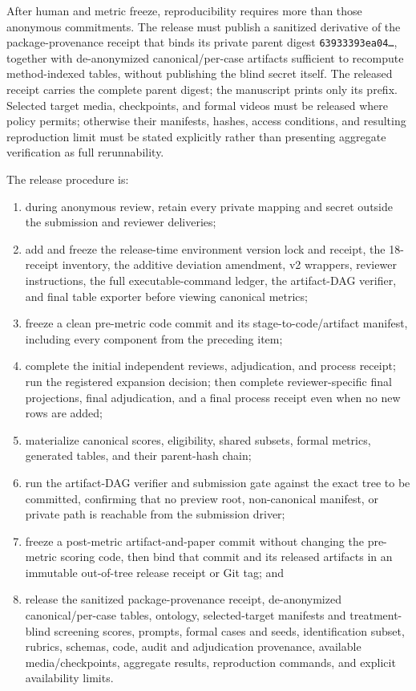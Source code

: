 After human and metric freeze, reproducibility requires more than those
anonymous commitments.  The release must publish a sanitized derivative of
the package-provenance receipt that binds its private parent digest
\texttt{63933393ea04\ldots}, together with de-anonymized canonical/per-case
artifacts sufficient to recompute method-indexed tables, without publishing
the blind secret itself.  The released receipt carries the complete parent
digest; the manuscript prints only its prefix.  Selected target media,
checkpoints, and formal videos must be released where policy permits;
otherwise their manifests, hashes, access conditions, and resulting
reproduction limit must be stated explicitly rather than presenting aggregate
verification as full rerunnability.

The release procedure is:
\begin{enumerate}
  \item during anonymous review, retain every private mapping and secret
        outside the submission and reviewer deliveries;
  \item add and freeze the release-time environment version lock and receipt,
        the 18-receipt inventory, the additive deviation amendment, v2 wrappers, reviewer
        instructions, the full executable-command ledger, the artifact-DAG
        verifier, and final table exporter before viewing canonical metrics;
  \item freeze a clean pre-metric code commit and its stage-to-code/artifact
        manifest, including every component from the preceding item;
  \item complete the initial independent reviews, adjudication, and process
        receipt; run the registered expansion decision; then complete
        reviewer-specific final projections, final adjudication, and a final
        process receipt even when no new rows are added;
  \item materialize canonical scores, eligibility, shared subsets, formal
        metrics, generated tables, and their parent-hash chain;
  \item run the artifact-DAG verifier and submission gate against the exact
        tree to be committed, confirming that no preview root, non-canonical
        manifest, or private path is reachable from the submission driver;
  \item freeze a post-metric artifact-and-paper commit without changing the
        pre-metric scoring code, then bind that commit and its released
        artifacts in an immutable out-of-tree release receipt or Git tag; and
  \item release the sanitized package-provenance receipt,
        de-anonymized canonical/per-case tables, ontology, selected-target
        manifests and treatment-blind screening scores, prompts, formal cases
        and seeds, identification subset, rubrics, schemas, code, audit and
        adjudication provenance, available media/checkpoints, aggregate
        results, reproduction commands, and explicit availability limits.
\end{enumerate}

